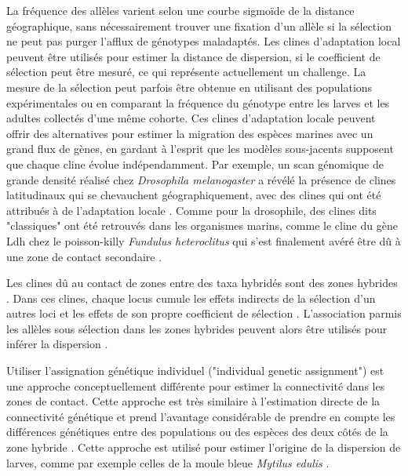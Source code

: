 \documentclass[a4paper,11pt,twoside]{report}
\begin{document}
La fréquence des allèles varient selon une courbe sigmoïde de la distance géographique, sans nécessairement trouver une fixation d'un allèle si la sélection ne peut pas purger l'afflux de génotypes maladaptés. Les clines d'adaptation local peuvent être utilisés pour estimer la distance de dispersion, si le coefficient de sélection peut être mesuré, ce qui représente actuellement un challenge. La mesure de la sélection peut parfois être obtenue en utilisant des populations expérimentales ou en comparant la fréquence du génotype entre les larves et les adultes collectés d'une même cohorte. Ces clines d'adaptation locale peuvent offrir des alternatives pour estimer la migration des espèces marines avec un grand flux de gènes, en gardant à l'esprit que les modèles sous-jacents supposent que chaque cline évolue indépendamment. Par exemple, un scan génomique de grande densité réalisé chez \textit{Drosophila melanogaster} a révélé la présence de clines latitudinaux \citep{fabian2012genome} qui se chevauchent géographiquement, avec des clines qui ont été attribués à de l'adaptation locale \citep{berry1993molecular}. Comme pour la drosophile, des clines dits "classiques" ont été retrouvés dans les organismes marins, comme le cline du gène Ldh chez le poisson-killy \textit{Fundulus heteroclitus} \citep{powers1978biochemical} qui s'est finalement avéré être dû à une zone de contact secondaire \citep{durand2009spatial}. 

Les clines dû au contact de zones entre des taxa hybridés sont des zones hybrides \citep{murray2006genomic}. Dans ces clines, chaque locus cumule les effets indirects de la sélection d'un autres loci et les effets de son propre coefficient de sélection \citep{barton1983multilocus}\citep{kruuk1999comparison}. L'association parmis les allèles sous sélection dans les zones hybrides peuvent alors être utilisés pour inférer la dispersion \citep{barton1993genetic}.

Utiliser l'assignation génétique individuel ("individual genetic assignment") est une approche conceptuellement différente pour estimer la connectivité dans les zones de contact. Cette approche est très similaire à l'estimation directe de la connectivité génétique et prend l'avantage considérable de prendre en compte les différences génétiques entre des populations ou des espèces des deux côtés de la zone hybride \citep{Gagnaire:2015aa}. Cette approche est utilisé pour estimer l'origine de la dispersion de larves, comme par exemple celles de la moule bleue \textit{Mytilus edulis} \citep{gilg2003geography}. 
\end{document}
